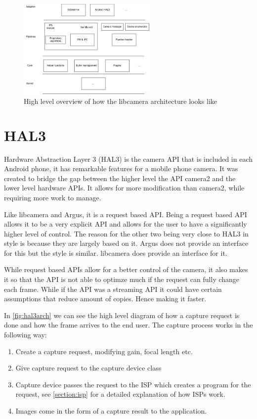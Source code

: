 \begin{figure}
    \begin{center}
        \includegraphics[width=0.60\textwidth]{figures/libcameraarch.png}
    \end{center}
    \caption{High level overview of how the libcamera architecture looks like}
    \label{fig:libcameraarch}
\end{figure}


\section{HAL3}
Hardware Abstraction Layer 3 (HAL3) is the camera API that is included in each
Android phone, it has remarkable features for a mobile phone camera. It was
created to bridge the gap between the higher level the API camera2 and the
lower level hardware APIs. It allows for more modification than camera2, while
requiring more work to manage.

Like libcamera and Argus, it is a request based API. Being a request based API
allows it to be a very explicit API and allows for the user to have a
significantly higher level of control. The reason for the other
two being very close to HAL3 in style is because they are largely based on it.
Argus does not provide an interface for this but the style is similar. libcamera
does provide an interface for it.

While request based APIs allow for a better control of the camera, it also
makes it so that the API is not able to optimze much if the request can fully
change each frame. While if the API was a streaming API it could have certain
assumptions that reduce amount of copies. Hence making it faster.

In \cref{fig:hal3arch} we can see the high level diagram of how a capture
request is done and how the frame arrives to the end user. The capture process
works in the following way:

\begin{enumerate}
    \item Create a capture request, modifying gain, focal length etc.
    \item Give capture request to the capture device class
    \item Capture device passes the request to the ISP which creates a program
        for the request, see \cref{section:isp} for a detailed explanation of
        how ISPs work.

    \item Images come in the form of a capture result to the application.
\end{enumerate}


